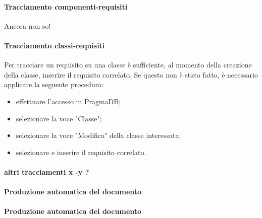  \paragraph{Tracciamento componenti-requisiti}
 Ancora non so!
 \paragraph{Tracciamento classi-requisiti}
 Per tracciare un requisito su una classe è sufficiente, al momento della creazione della classe, inserire il requisito correlato. Se questo non è stato fatto, è necessario applicare la seguente procedura:
 \begin{itemize}
 	\item effettuare l'accesso in PragmaDB;
 	\item selezionare la voce "Classe";
 	\item selezionare la voce "Modifica" della classe interessata;
 	\item selezionare e inserire il requisito correlato.
 \end{itemize}
 \paragraph{altri tracciamenti x -y ?}
 \paragraph{Produzione automatica del documento \STdoc}
 \paragraph{Produzione automatica del documento \DPdoc}
